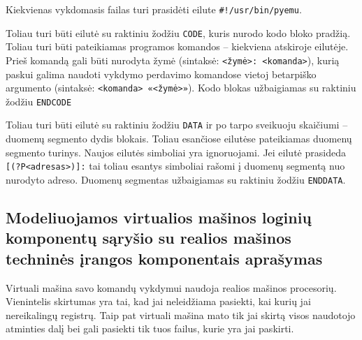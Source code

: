 Kiekvienas vykdomasis failas turi prasidėti eilute
\verb|#!/usr/bin/pyemu|.

Toliau turi būti eilutė su raktiniu žodžiu \verb|CODE|, kuris nurodo
kodo bloko pradžią. Toliau turi būti pateikiamas programos komandos – 
kiekviena atskiroje eilutėje. Prieš komandą gali būti nurodyta žymė
(sintaksė: \verb|<žymė>: <komanda>|), kurią paskui galima naudoti vykdymo
perdavimo komandose vietoj betarpiško argumento (sintaksė: 
\verb|<komanda> «<žymė>»|). Kodo blokas užbaigiamas su raktiniu žodžiu
\verb|ENDCODE|

Toliau turi būti eilutė su raktiniu žodžiu \verb|DATA| ir po tarpo 
sveikuoju skaičiumi – duomenų segmento dydis blokais.
Toliau esančiose eilutėse pateikiamas duomenų segmento turinys. Naujos
eilutės simboliai yra ignoruojami. Jei eilutė prasideda 
\verb|[(?P<adresas>)]:| tai toliau esantys simboliai rašomi į duomenų
segmentą nuo nurodyto adreso. Duomenų segmentas užbaigiamas su 
raktiniu žodžiu \verb|ENDDATA|.

\subsection{Modeliuojamos virtualios mašinos loginių komponentų sąryšio su 
realios mašinos techninės įrangos komponentais aprašymas}

Virtuali mašina savo komandų vykdymui naudoja realios mašinos procesorių.
Vienintelis skirtumas yra tai, kad jai neleidžiama pasiekti, kai kurių
jai nereikalingų registrų. Taip pat virtuali mašina mato tik jai skirtą
visos naudotojo atminties dalį bei gali pasiekti tik tuos failus, kurie
yra jai paskirti.
   

